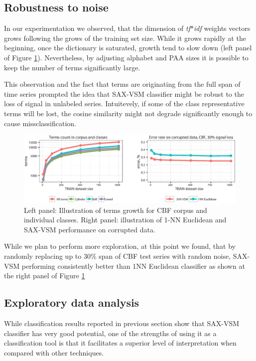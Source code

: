 \documentclass{llncs}
\begin{document}
\subsection{Robustness to noise}
In our experimentation we observed, that the dimension of \textit{tf$\ast$idf} weights vectors 
grows following the grows of the training set size. While it grows rapidly at the beginning, once
the dictionary is saturated, growth tend to slow down (left panel of Figure \ref{fig:corrupted}). 
Nevertheless, by adjusting alphabet and PAA sizes it is possible to keep the number of terms
significantly large. 

This observation and the fact that terms are originating from the full span of time series prompted
the idea that SAX-VSM classifier might be robust to the loss of signal in unlabeled
series. Intuitevely, if some of the class representative terms will be lost, the cosine
similarity might not degrade significantly enough to cause missclassification.

\begin{figure}[H]
   \centering
   \includegraphics[width=115mm]{figures/corrupted.eps}
   \caption{Left panel: Illustration of terms growth for CBF corpus and individual classes.
Right panel: illustration of 1-NN Euclidean and SAX-VSM performance on corrupted data.}
   \label{fig:corrupted}
\end{figure}

While we plan to perform more exploration, at this point we found, that by randomly replacing up
to 30\% span of CBF test series with random noise, SAX-VSM performing consistently better
than 1NN Euclidean classifier as shown at the right panel of Figure \ref{fig:corrupted}

\subsection{Exploratory data analysis}
While classification results reported in previous section show that SAX-VSM classifier
has very good potential, one of the strengths of using it as a classification tool is that
it facilitates a superior level of interpretation when compared with other techniques. 
\end{document}
